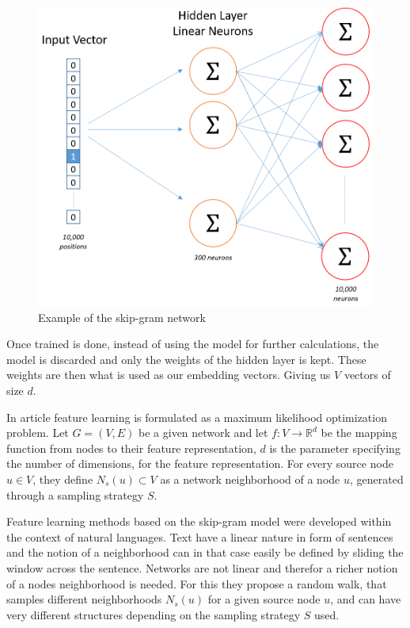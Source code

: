 \begin{figure}[H]
\centering
  \includegraphics[width=\linewidth]{Article/figures/skip_gram_net_arch.png}
  \caption{Example of the skip-gram network \cite{Word2vec}}
  \label{fig:skip-gram_example}
\end{figure}

Once trained is done, instead of using the model for further calculations, the model is discarded and only the weights of the hidden layer is kept. These weights are then what is used as our embedding vectors. Giving us $V$ vectors of size $d$.


In article \cite{Node2vec} feature learning is formulated as a maximum likelihood optimization problem. Let $G = (V,E)$ be a given network and let $f : V \to \mathbb{R}^d$ be the mapping function from nodes to their feature representation, $d$ is the parameter specifying the number of dimensions, for the feature representation. For every source node $u \in V$, they define $N_s (u) \subset V$ as a network neighborhood of a node $u$, generated through a sampling strategy $S$.

Feature learning methods based on the skip-gram model were developed within the context of natural languages. Text have a linear nature in form of sentences and the notion of a neighborhood can in that case easily be defined by sliding the window across the sentence. Networks are not linear and therefor a richer notion of a nodes neighborhood is needed. For this they propose a random walk, that samples different neighborhoods $N_s (u)$ for a given source node $u$, and can have very different structures depending on the sampling strategy $S$ used.

